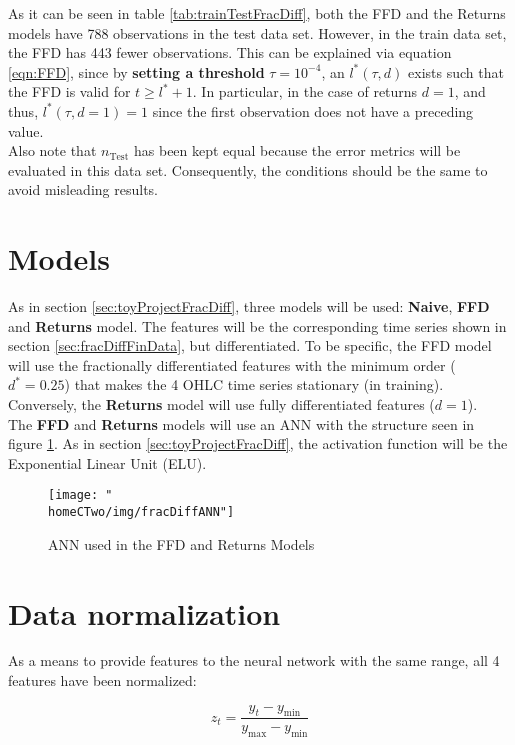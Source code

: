 \documentclass[a4paper]{report}
\newcommand{\homeCTwo}{../../Chapter 2 - FracDiff/Draft}
\begin{document}
As it can be seen in table \ref{tab:trainTestFracDiff}, both the FFD and the 
Returns models have 788 observations in the test data set. However, in the 
train data set, the FFD has 443 fewer observations. This can be explained via 
equation \ref{eqn:FFD}, since by \textbf{setting a threshold} $\tau = 10^{-4}
$, an $l^*(\tau, d)$ exists such that the FFD is valid for $t \geq l^* +1$. 
In particular, in the case of returns $d = 1$, and thus, $l^*(\tau, d = 1) = 
1$ since the first observation does not have a preceding value.\\

Also note that $n_{\text{Test}}$ has been kept equal because the error 
metrics will be evaluated in this data set. Consequently, the conditions 
should be the same to avoid misleading results.

\section{Models}
As in section \ref{sec:toyProjectFracDiff}, three models will be used: 
\textbf{Naive}, \textbf{FFD} and \textbf{Returns} model. The features will 
be the corresponding time series shown in section \ref{sec:fracDiffFinData}, 
but differentiated. To be specific, the FFD model will use the fractionally 
differentiated features with the minimum order ($d^* = 0.25$) that makes the 
4 OHLC time series stationary (in training). Conversely, the 
\textbf{Returns} model will use fully differentiated features ($d = 1$).\\

The \textbf{FFD} and \textbf{Returns} models will use an ANN with the 
structure seen in figure \ref{fig:fracDiffANN}. As in section 
\ref{sec:toyProjectFracDiff}, the activation function will be the 
Exponential Linear Unit (ELU).

\begin{figure}[htbp]
	\centering
	\texttt{[image: "\\homeCTwo/img/fracDiffANN"]}
	\caption{ANN used in the FFD and Returns Models}
	\label{fig:fracDiffANN}
\end{figure}

\section{Data normalization}
As a means to provide features to the neural network with the same range, 
all 4 features have been normalized:

\begin{equation*}
	z_t = \frac{y_t - y_{\text{min}}}{y_{\text{max}} - y_{\text{min}}}
\end{equation*}
\end{document}
